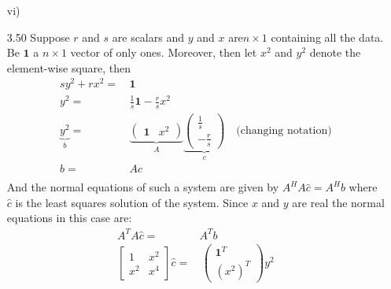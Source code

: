 \documentclass[letterpaper,12pt]{article}
\theoremstyle{definition}
\begin{document}
\begin{enumerate}
vi)
\item[3.50] Suppose $r$ and $s$ are scalars and $y$ and $x$ are$n\times 1 $ containing all the data. Be $\mathbf{1}$ a $ n\times 1$ vector of only ones. Moreover, then let $x^2$ and $y^2$ denote the element-wise square, then 
\begin{align*}
 sy^2+rx^2=&\, \mathbf{1}\\
 y^2 =&\,  \frac{1}{s}\mathbf{1} -\frac{r}{s}x^2\\
 \underbrace{y^2}_b =&\, \underbrace{\begin{pmatrix}
\mathbf{1}& x^2
\end{pmatrix}}_A
\underbrace{\begin{pmatrix}
\frac{1}{s} \\ -\frac{r}{s}
\end{pmatrix}}_c \quad \text{(changing notation)}\\
b=&\, Ac \\
\end{align*}
And the normal equations of such a system are given by $A^HA\hat{c}=A^Hb$ where $\hat{c}$ is the least squares solution of the system. Since $x$ and $y$ are real the normal equations in this case are:
\begin{align*}
A^TA\hat{c}=&A^Tb \\
\begin{bmatrix}
1 & x^2 \\ x^2 & x^4
\end{bmatrix} \hat{c} =& \, \begin{pmatrix}
\mathbf{1}^T \\ (x^2)^T
\end{pmatrix} y^2
\end{align*}
\end{enumerate}
\end{document}
